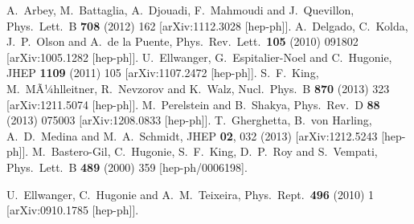 \documentclass[final,3p,times,pdflatex]{elsarticle}
\begin{document}
\begin{thebibliography}{10}
  A.~Arbey, M.~Battaglia, A.~Djouadi, F.~Mahmoudi and J.~Quevillon,
  Phys.\ Lett.\ B {\bf 708} (2012) 162
  [arXiv:1112.3028 [hep-ph]].
  A.~Delgado, C.~Kolda, J.~P.~Olson and A.~de la Puente,
  Phys.\ Rev.\ Lett.\  {\bf 105} (2010) 091802
  [arXiv:1005.1282 [hep-ph]].
  U.~Ellwanger, G.~Espitalier-Noel and C.~Hugonie,
  JHEP {\bf 1109} (2011) 105
  [arXiv:1107.2472 [hep-ph]].
  S.~F.~King, M.~MÃ¼hlleitner, R.~Nevzorov and K.~Walz,
  Nucl.\ Phys.\ B {\bf 870} (2013) 323
  [arXiv:1211.5074 [hep-ph]].
  M.~Perelstein and B.~Shakya,
  Phys.\ Rev.\ D {\bf 88} (2013) 075003
  [arXiv:1208.0833 [hep-ph]].
  T.~Gherghetta, B.~von Harling, A.~D.~Medina and M.~A.~Schmidt,
  JHEP {\bf 02}, 032 (2013)
  [arXiv:1212.5243 [hep-ph]].
  M.~Bastero-Gil, C.~Hugonie, S.~F.~King, D.~P.~Roy and S.~Vempati,
  Phys.\ Lett.\ B {\bf 489} (2000) 359
  [hep-ph/0006198].

  U.~Ellwanger, C.~Hugonie and A.~M.~Teixeira,
  Phys.\ Rept.\  {\bf 496} (2010) 1
  [arXiv:0910.1785 [hep-ph]].


\end{thebibliography}
\end{document}
